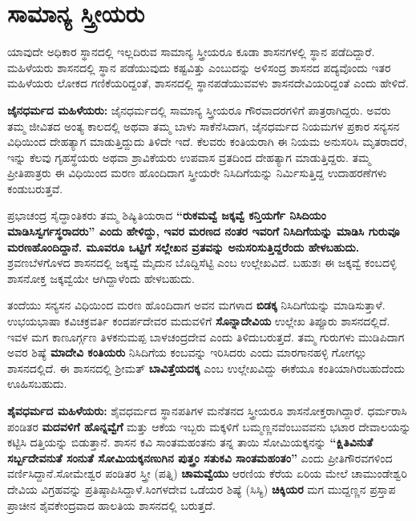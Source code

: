 \section{ಸಾಮಾನ್ಯ ಸ್ತ್ರೀಯರು}

ಯಾವುದೇ ಅಧಿಕಾರ ಸ್ಥಾನದಲ್ಲಿ ಇಲ್ಲದಿರುವ ಸಾಮಾನ್ಯ ಸ್ತ್ರೀಯರೂ ಕೂಡಾ ಶಾಸನಗಳಲ್ಲಿ ಸ್ಥಾನ ಪಡೆದಿದ್ದಾರೆ. ಮಹಿಳೆಯರು ಶಾಸನದಲ್ಲಿ ಸ್ಥಾನ ಪಡೆಯುವುದು ಕಷ್ಟವಿತ್ತು ಎಂಬುದನ್ನು ಅಳಿಸಂದ್ರ ಶಾಸನದ ಪದ್ಯವೊಂದು ಇತರ ಮಹಿಳೆಯರು ಲೋಕದ ಗಣಿಕೆಯರಿದ್ದಂತೆ, ಶಾಸನದಲ್ಲಿ ಸ್ಥಾನಪಡೆಯುವವಳು ಶಾಸನದೇವಿಯರಿದ್ದಂತೆ ಎಂದು ಹೇಳಿದೆ.

\textbf{ಜೈನಧರ್ಮದ ಮಹಿಳೆಯರು: } ಜೈನಧರ್ಮದಲ್ಲಿ ಸಾಮಾನ್ಯ ಸ್ತ್ರೀಯರೂ ಗೌರವಾದರಗಳಿಗೆ ಪಾತ್ರರಾಗಿದ್ದರು. ಅವರು ತಮ್ಮ ಜೀವಿತದ ಅಂತ್ಯ ಕಾಲದಲ್ಲಿ ಅಥವಾ ತಮ್ಮ ಬಾಳು ಸಾಕೆನೆಸಿದಾಗ, ಜೈನಧರ್ಮದ ನಿಯಮಗಳ ಪ್ರಕಾರ ಸನ್ಯಸನ ವಿಧಿಯಿಂದ ದೇಹತ್ಯಾಗ ಮಾಡುತ್ತಿದ್ದುದು ತಿಳಿದೇ ಇದೆ. ಕೆಲವರು ಕಂತಿಯರಾಗಿ ಈ ನಿಯಮ ಅನುಸರಿಸಿ ಮೃತರಾದರೆ, ಇನ್ನು ಕೆಲವು ಗೃಹಸ್ಥೆಯರು ಅಥವಾ ಶ್ರಾವಿಕೆಯರು ಉಪವಾಸ ವ್ರತದಿಂದ ದೇಹತ್ಯಾಗ ಮಾಡುತ್ತಿದ್ದರು. ತಮ್ಮ ಪ್ರೀತಿಪಾತ್ರರು ಈ ವಿಧಿಯಿಂದ ಮರಣ ಹೊಂದಿದಾಗ ಸ್ತ್ರೀಯರೇ ನಿಸಿದಿಗೆಯನ್ನು ನಿರ್ಮಿಸುತ್ತಿದ್ದ ಉದಾಹರಣೆಗಳು ಕಂಡುಬರುತ್ತವೆ.

ಪ್ರಭಾಚಂದ್ರ ಸೈದ್ಧಾಂತಿಕರು ತಮ್ಮ ಶಿಷ್ಯಿತಿಯರಾದ \textbf{“ರುಕಮವ್ವೆ ಜಕ್ಕವ್ವೆ ಕನ್ತಿಯರ್ಗೆ ನಿಸಿದಿಯಂ ಮಾಡಿಸಿ\general{\break }ಸ್ವರ್ಗಸ್ಥರಾದರು” ಎಂದು ಹೇಳಿದ್ದು, ಇವರ ಮರಣದ ನಂತರ ಇವರಿಗೆ ನಿಸಿದಿಗೆಯನ್ನು ಮಾಡಿಸಿ ಗುರುವೂ ಮರಣಹೊಂದಿದ್ದಾನೆ. ಮೂವರೂ ಒಟ್ಟಿಗೆ ಸಲ್ಲೇಖನ ವ್ರತವನ್ನು ಅನುಸರಿಸುತ್ತಿದ್ದರೆಂದು ಹೇಳಬಹುದು.} ಶ್ರವಣಬೆಳಗೊಳದ ಶಾಸನದಲ್ಲಿ ಜಕ್ಕವ್ವೆ ಮೈದುನ ಬೊದ್ದಿಸೆಟ್ಟಿ ಎಂಬ ಉಲ್ಲೇಖವಿದೆ. ಬಹುಶಃ ಈ ಜಕ್ಕವ್ವೆ ಕಂಬದಳ್ಳಿ ಶಾಸನೋಕ್ತ ಜಕ್ಕವ್ವೆಯೇ ಆಗಿದ್ದಾಳೆಂದು ಹೇಳಬಹುದು.

ತಂದೆಯು ಸನ್ಯಸನ ವಿಧಿಯಿಂದ ಮರಣ ಹೊಂದಿದಾಗ ಅವನ ಮಗಳಾದ \textbf{ಬಿಡಕ್ಕ} ನಿಸಿದಿಗೆಯನ್ನು ಮಾಡಿಸುತ್ತಾಳೆ. ಉಭಯಭಾಷಾ ಕವಿಚಕ್ರವರ್ತಿ ಕಂದರ್ಪದೇವರ ಮದುವಳಿಗೆ \textbf{ಸೊನ್ನಾದೇವಿಯ} ಉಲ್ಲೇಖ ತಿಪ್ಪೂರು ಶಾಸನದಲ್ಲಿದೆ. ಇವಳ ಮಗ ಕಾಣೂರ್ಗ್ಗಣ ತಿಳಕನುಮಪ್ಪ ಬಾಳಚಂದ್ರದೇವ ಎಂದು ತಿಳಿದುಬರುತ್ತದೆ. ತಮ್ಮ ಗುರುಗಳು ಮುಡಿಪಿದಾಗ ಅವರ ಶಿಷ್ಯೆ \textbf{ಮಾದೇವಿ ಕಂತಿಯರು} ನಿಸಿದಿಗೆಯ ಕಂಬವನ್ನು ಇರಿಸಿದರು ಎಂದು ಮಾರಗಾನಹಳ್ಳಿ ಗೋಗಲ್ಲು ಶಾಸನದಲ್ಲಿದೆ. ಈ ಶಾಸನದಲ್ಲಿ ಶ‍್ರೀಮತ್​ \textbf{ಬಾವಿತ್ತೆಯದಕ್ಕ} ಎಂಬ ಉಲ್ಲೇಖವಿದ್ದು ಈಕೆಯೂ ಕಂತಿಯಾಗಿರಬಹುದೆಂದು ಊಹಿಸಬಹುದು.

\textbf{ಶೈವಧರ್ಮದ ಮಹಿಳೆಯರು: } ಶೈವಧರ್ಮದ ಸ್ಥಾನಪತಿಗಳ ಮನೆತನದ ಸ್ತ್ರೀಯರೂ ಶಾಸನೋಕ್ತರಾಗಿದ್ದಾರೆ. ಧರ್ಮರಾಸಿ ಪಂಡಿತರ \textbf{ಮದವಳಿಗೆ ಹೊನ್ನವ್ವೆಗೆ} ಮತ್ತು ಆಕೆಯ ಇಬ್ಬರು ಮಕ್ಕಳಿಗೆ ಬಮ್ಮಣ್ಣನವೆಂಬುವವನು ಭಟಾರ ದೇವಾಲಯನ್ನು ಕಟ್ಟಿಸಿ ದತ್ತಿಯನ್ನು ಬಿಡುತ್ತಾನೆ. ಶಾಸನ ಕವಿ ಸಾಂತಮಹಂತನು ತನ್ನ ತಾಯಿ ಸೋಮಿಯಕ್ಕನನ್ನು \textbf{“ಕ್ಷಿತಿವಿನುತೆ ಸರ್ಬ್ಬದೇವನುತೆ ಸಂನುತೆ ಸೋಮಿಯಕ್ಕನಣುಗಿನ ಪುತ್ತ್ರಂ ಸತುಕವಿ ಸಾಂತಮಹಂತಂ”} ಎಂದು ಪ್ರೀತಿಗೌರವಗಳಿಂದ ವರ್ಣಿಸಿದ್ದಾನೆ.ಸೋಮೇಶ್ವರ ಪಂಡಿತರ ಸ್ತ್ರೀ (ಪತ್ನಿ) \textbf{ಚಾಮವ್ವೆಯು} ಆರಣಿಯ ಕೆರೆಯ ಏರಿಯ ಮೇಲೆ ಚಾಮುಂಡೇಶ್ವರಿ ದೇವಿಯ ವಿಗ್ರಹವನ್ನು ಪ್ರತಿಷ್ಠಾಪಿಸಿದ್ದಾಳೆ.ಸಿಂಗಳದೇವ ಒಡೆಯರ ಶಿಷ್ಯೆ (ಸಿಸ್ಯಿ) \textbf{ಚಿಕ್ಕಿಯರ} ಮಗ ಮುದ್ದಣ್ಣನ ಪ್ರಸ್ತಾಪ ಪ್ರಾಚೀನ ಶೈವಕೇಂದ್ರವಾದ ಹಾಲತಿಯ ಶಾಸನದಲ್ಲಿ ಬರುತ್ತದೆ.

